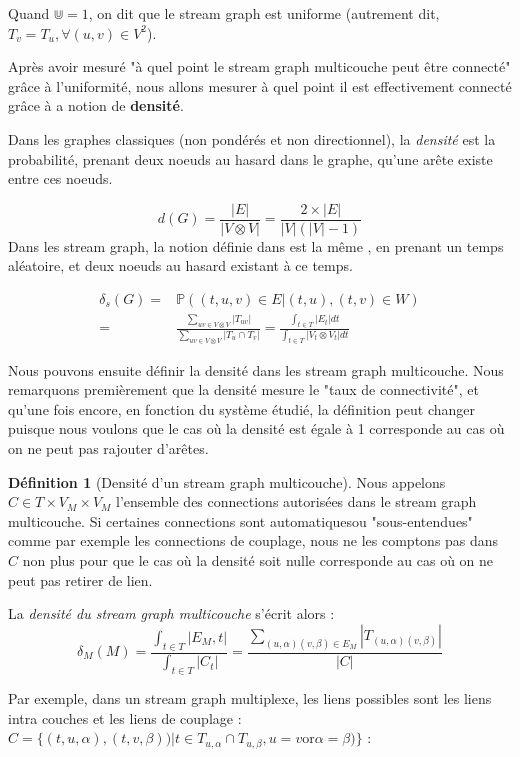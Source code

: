 \documentclass[11pt,a4paper]{article}
\theoremstyle{definition}
\newtheorem{defn}{Définition}
\theoremstyle{remark}
\theoremstyle{remark}
\def \stg {stream graph}
\def \stgm {stream graph multicouche}
\begin{document}
	Quand $\Cup=1$, on dit que le \stg{} est uniforme (autrement dit, $T_v = T_u, \forall (u,v) \in V^2$).


    Après avoir mesuré "à quel point le \stgm{} peut être connecté" grâce à l'uniformité, nous allons mesurer à quel point il est effectivement connecté grâce à a notion de \textbf{densité}.
    
    Dans les graphes classiques (non pondérés et non directionnel), la {\em densité} est la probabilité, prenant deux noeuds au hasard dans le graphe, qu'une arête existe entre ces noeuds.
    
		\[
			d(G) = \frac{|E|}{|V\otimes V|} = \frac{2\times |E|}{|V|(|V|-1)}
		\]
	Dans les \stg{}, la notion définie dans \cite{stream} est la même , en prenant un temps aléatoire, et deux noeuds au hasard existant à ce temps. 	

		\begin{align*}
			\delta_s(G) = & \mathbb{P}((t,u,v)\in E| (t,u),(t,v) \in W) \\
			 =  & \frac{\sum_{uv \in V \otimes V}{|T_{uv}|}}{\sum_{uv \in V\otimes V}{|T_u\cap T_v|}}= \frac{\int_{t\in T}{|E_t|dt}}{\int_{t\in T}{|V_t\otimes V_t|dt}}
		\end{align*}
		
	Nous pouvons ensuite définir la densité dans les \stgm{}. Nous remarquons premièrement que la densité mesure le "taux de connectivité", et qu'une fois encore, en fonction du système étudié, la définition peut changer puisque nous voulons que le cas où la densité est égale à 1 corresponde au cas où on ne peut pas rajouter d'arêtes. 

\begin{defn}[Densité d'un \stgm{}]	
	Nous appelons  $C \in T \times V_M\times V_M$ l'ensemble des connections autorisées dans le \stgm{}. Si certaines connections sont \og automatiques\fg ou "sous-entendues" comme par exemple les connections de couplage, nous ne les comptons pas dans $C$ non plus pour que le cas où la densité soit nulle corresponde au cas où on ne peut pas retirer de lien.

	La {\em densité du \stgm{}} s'écrit alors : 
	\[
		\delta_M (M) 
		= \frac{\int_{t\in T}|E_M,t|}{\int_{t\in T}|C_t|} 
		= \frac{\sum_{(u,\alpha)(v,\beta) \in E_M}|T_{(u,\alpha)(v,\beta)}|}{|C|}
	\]
\end{defn}	
	
	Par exemple, dans un \stg{} multiplexe, les liens possibles sont les liens intra couches et les liens de couplage : $C=\{(t,u,\alpha),(t,v,\beta))| t\in T_{u,\alpha} \cap T_{u,\beta}, u=v \text{or} \alpha = \beta)\}$ :
\end{document}

